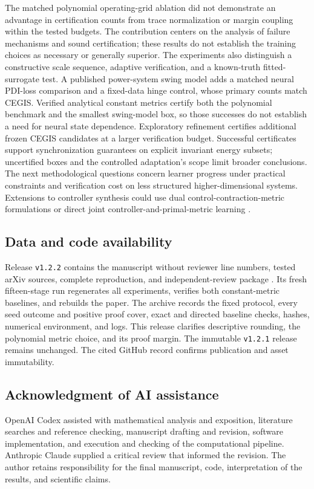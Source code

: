 \documentclass[12pt,onecolumn,journal]{IEEEtran}
\begin{document}
The matched polynomial operating-grid ablation did not demonstrate an advantage in certification counts from trace normalization or margin coupling within the tested budgets. The contribution centers on the analysis of failure mechanisms and sound certification; these results do not establish the training choices as necessary or generally superior. The experiments also distinguish a constructive scale sequence, adaptive verification, and a known-truth fitted-surrogate test. A published power-system swing model adds a matched neural PDI-loss comparison and a fixed-data hinge control, whose primary counts match CEGIS. Verified analytical constant metrics certify both the polynomial benchmark and the smallest swing-model box, so those successes do not establish a need for neural state dependence. Exploratory refinement certifies additional frozen CEGIS candidates at a larger verification budget. Successful certificates support synchronization guarantees on explicit invariant energy subsets; uncertified boxes and the controlled adaptation's scope limit broader conclusions. The next methodological questions concern learner progress under practical constraints and verification cost on less structured higher-dimensional systems. Extensions to controller synthesis could use dual control-contraction-metric formulations \cite{manchester2017} or direct joint controller-and-primal-metric learning \cite{davydov2025partitioning,harapanahalli2026}.

\subsection*{Data and code availability}
Release \texttt{v1.2.2} contains the manuscript without reviewer line numbers, tested arXiv sources, complete reproduction, and independent-review package \cite{nsp_release}. Its fresh fifteen-stage run regenerates all experiments, verifies both constant-metric baselines, and rebuilds the paper. The archive records the fixed protocol, every seed outcome and positive proof cover, exact and directed baseline checks, hashes, numerical environment, and logs. This release clarifies descriptive rounding, the polynomial metric choice, and its proof margin. The immutable \texttt{v1.2.1} release remains unchanged. The cited GitHub record confirms publication and asset immutability.

\subsection*{Acknowledgment of AI assistance}
OpenAI Codex assisted with mathematical analysis and exposition, literature searches and reference checking, manuscript drafting and revision, software implementation, and execution and checking of the computational pipeline. Anthropic Claude supplied a critical review that informed the revision. The author retains responsibility for the final manuscript, code, interpretation of the results, and scientific claims.
\end{document}
